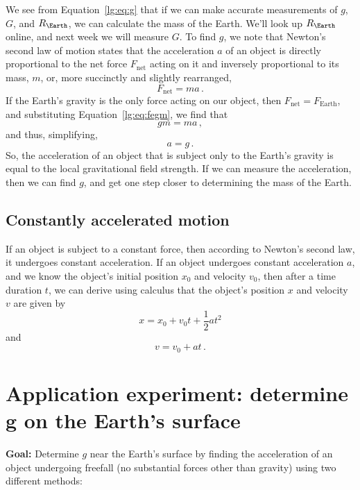 We see from Equation~\ref{lg:eq:g} that if we can make accurate measurements of $g$, $G$, and $R_\Earth$, we can calculate the mass of the Earth. We'll look up $R_\Earth$ online, and next week we will measure $G$. To find $g$, we note that Newton's second law of motion states that the acceleration $a$ of an object is directly proportional to the net force $F_\textrm{net}$ acting on it and inversely proportional to its mass, $m$, or, more succinctly and slightly rearranged,
\begin{equation}
 F_\textrm{net} = m a \,.
\end{equation}
If the Earth's gravity is the only force acting on our object, then $F_\textrm{net} = F_\textrm{Earth}$, and substituting Equation~\ref{lg:eq:fegm}, we find that
\begin{equation}
 g m = m a \,,
\end{equation}
and thus, simplifying,
\begin{equation}
 a = g \,.
\end{equation}
So, the acceleration of an object that is subject only to the Earth's gravity is equal to the local gravitational field strength. If we can measure the acceleration, then we can find $g$, and get one step closer to determining the mass of the Earth.

\subsection{Constantly accelerated motion}

If an object is subject to a constant force, then according to Newton's second law, it undergoes constant acceleration. If an object undergoes constant acceleration $a$, and we know the object's initial position $x_0$ and velocity $v_0$, then after a time duration $t$, we can derive using calculus that the object's position $x$ and velocity $v$ are given by
\begin{equation}\label{lg:eq:x-const-a}
 x = x_0 + v_0 t + \frac{1}{2} a t^2
\end{equation}
and
\begin{equation}
 v = v_0 + a t \,.
\end{equation}

\section{Application experiment: determine $\bm{g}$ on the Earth's surface}

\textbf{Goal:} Determine $g$ near the Earth's surface by finding the acceleration of an object undergoing freefall (no substantial forces other than gravity) using two different methods: 

